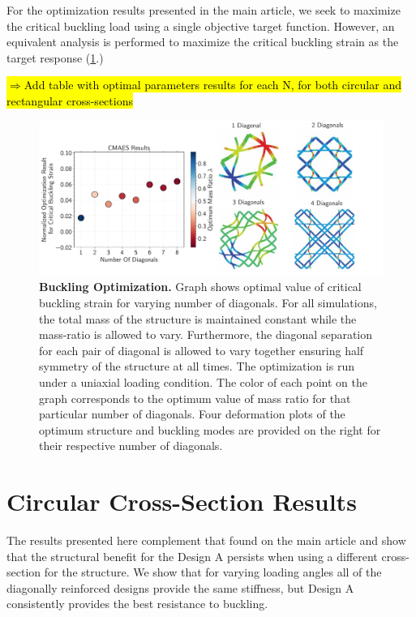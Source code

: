 \documentclass[10pt,twoside]{fernandes_supp}
\newcommand{\mf}[1]{\noindent\color{color2}\sethlcolor{cyan}\hl{$\Longrightarrow$#1}\normalcolor}
\begin{document}
For the optimization results presented in the main article, we seek to maximize the critical buckling load using a single objective target function. However, an equivalent analysis is performed to maximize the critical buckling strain as the target response (\cref{BucklingOptimization}.) 

\mf{Add table with optimal parameters results for each N, for both circular and rectangular cross-sections}

\begin{figure}
    \centering
    \includegraphics[width=0.9\linewidth]{SFig6.pdf}
    \caption{{\bf Buckling Optimization.} Graph shows optimal value of critical buckling strain for varying number of diagonals. For all simulations, the total mass of the structure is maintained constant while the mass-ratio is allowed to vary. Furthermore, the diagonal separation for each pair of diagonal is allowed to vary together ensuring half symmetry of the structure at all times. The optimization is run under a uniaxial loading condition. The color of each point on the graph corresponds to the optimum value of mass ratio for that particular number of diagonals. Four deformation plots of the optimum structure and buckling modes are provided on the right for their respective number of diagonals.}
    \label{BucklingOptimization}
\end{figure}

\section{Circular Cross-Section Results}
The results presented here complement that found on the main article and show that the structural benefit for the Design A persists when using a different cross-section for the structure. We show that for varying loading angles all of the diagonally reinforced designs provide the same stiffness, but Design A consistently provides the best resistance to buckling. 
\end{document}
